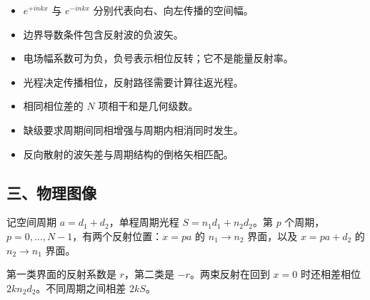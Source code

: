 \documentclass[12pt,a4paper,fontset=fandol]{ctexart}
\providecommand{\tightlist}{\setlength{\itemsep}{0pt}\setlength{\parskip}{0pt}}
\begin{document}
\begin{itemize}
\tightlist
\item
  \(e^{+inkx}\) 与 \(e^{-inkx}\) 分别代表向右、向左传播的空间幅。
\item
  边界导数条件包含反射波的负波矢。
\item
  电场幅系数可为负，负号表示相位反转；它不是能量反射率。
\item
  光程决定传播相位，反射路径需要计算往返光程。
\item
  相同相位差的 \(N\) 项相干和是几何级数。
\item
  缺级要求周期间同相增强与周期内相消同时发生。
\item
  反向散射的波矢差与周期结构的倒格矢相匹配。
\end{itemize}

\subsection{三、物理图像}\label{ux4e09ux7269ux7406ux56feux50cf-6}

记空间周期 \(a=d_1+d_2\)，单程周期光程 \(S=n_1d_1+n_2d_2\)。第 \(p\)
个周期，\(p=0,\ldots,N-1\)，有两个反射位置：\(x=pa\) 的 \(n_1\to n_2\)
界面，以及 \(x=pa+d_2\) 的 \(n_2\to n_1\) 界面。

第一类界面的反射系数是 \(r\)，第二类是 \(-r\)。两束反射在回到 \(x=0\)
时还相差相位 \(2kn_2d_2\)。不同周期之间相差 \(2kS\)。

\begin{center}
\begin{minipage}{\linewidth}
\centering\begingroup
{}
\ifdim\wd\diagrambox>.88\linewidth
\sbox{\diagrambox}{\resizebox{.88\linewidth}{!}{\usebox{\diagrambox}}}
\fi
\ifdim\ht\diagrambox>.29\textheight
\resizebox{!}{.29\textheight}{\usebox{\diagrambox}}
\else\usebox{\diagrambox}\fi
\par{}
\endgroup\end{minipage}
\end{center}
\end{document}
